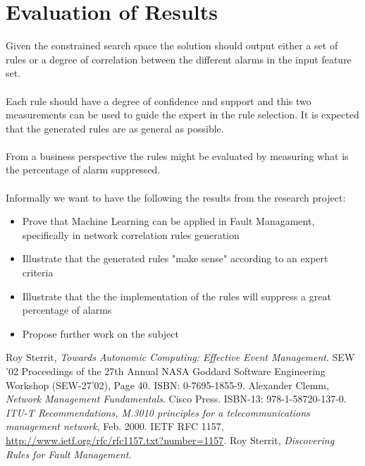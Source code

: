 \documentclass[10pt,a4paper]{article}
\begin{document}
 \section{Evaluation of Results}

Given the constrained search space the solution should output either a set of rules or a degree of correlation between the different alarms in the input feature set.
\\\\
Each rule should have a degree of confidence and support and this two measurements can be used to guide the expert in the rule selection. It is expected that the generated rules are as general as possible.
\\\\
From a business perspective the rules might be evaluated by measuring what is the percentage of alarm suppressed. 
\\\\
Informally we want to have the following the results from the research project:
\begin{itemize}
\item Prove that Machine Learning can be applied in Fault Managament, specifically in network correlation rules generation
\item Illustrate that the generated rules "make sense" according to an expert criteria
\item Illustrate that the the implementation of the rules will suppress a great percentage of alarms
\item Propose further work on the subject
\end{itemize}


 \begin{thebibliography}{9}
 Roy Sterrit,
        \emph{Towards Autonomic Computing: Effective Event Management}.
        SEW '02 Proceedings of the 27th Annual NASA Goddard Software Engineering Workshop (SEW-27'02), Page 40. ISBN: 0-7695-1855-9.
 Alexander Clemm,
        \emph{Network Management Fundamentals}.
       Cisco Press. ISBN-13: 978-1-58720-137-0.
\emph{ITU-T Recommendations, M.3010 principles for a
telecommunications management network}, Feb. 2000.
IETF RFC 1157, \url{http://www.ietf.org/rfc/rfc1157.txt?number=1157}.
 Roy Sterrit,
        \emph{Discovering Rules for Fault Management}.
 \end{thebibliography}
\end{document}
